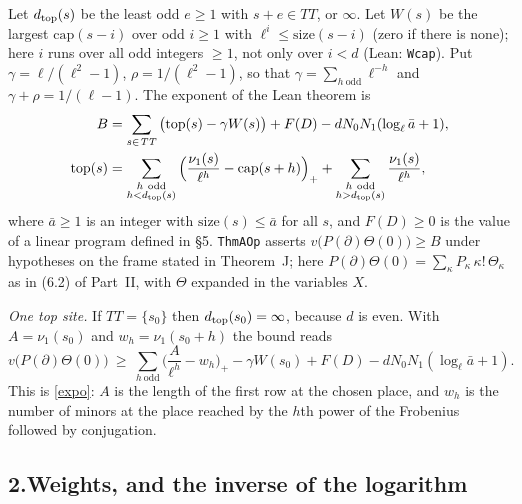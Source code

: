 \documentclass[11pt,letterpaper]{article}
\begin{document}
Let $d_{\rm top}(s)$ be the least odd $e\ge1$ with $s+e\in\mathit{TT}$, or $\infty$. Let $W(s)$ be the
largest $\mathrm{cap}(s-i)$ over odd $i\ge1$ with $\ell^i\le\mathrm{size}(s-i)$ (zero if there is none);
here $i$ runs over all odd integers $\ge1$, not only over $i<d$ (Lean: \texttt{Wcap}). Put
$\gamma=\ell/(\ell^2-1)$, $\rho=1/(\ell^2-1)$, so that $\gamma=\sum_{h\ \mathrm{odd}}\ell^{-h}$ and
$\gamma+\rho=1/(\ell-1)$. The exponent of the Lean theorem is
\begin{equation}\label{dv:B}
\begin{aligned}
 B&=\sum_{s\in\mathit{TT}}\big(\mathrm{top}(s)-\gamma W(s)\big)+F(D)-dN_0N_1(\log_\ell\bar a+1),\\
 \mathrm{top}(s)&=\sum_{\substack{h\ \mathrm{odd}\\ h<d_{\rm top}(s)}}\Big(\frac{\nu_1(s)}{\ell^h}-\mathrm{cap}(s+h)\Big)_+
   +\sum_{\substack{h\ \mathrm{odd}\\ h>d_{\rm top}(s)}}\frac{\nu_1(s)}{\ell^h},
\end{aligned}
\end{equation}
where $\bar a\ge1$ is an integer with $\mathrm{size}(s)\le\bar a$ for all $s$, and $F(D)\ge0$ is the value of a linear
program defined in \S5. \texttt{ThmAOp} asserts $v\big(P(\partial)\Theta(0)\big)\ge B$ under hypotheses on the
frame stated in Theorem~J; here $P(\partial)\Theta(0)=\sum_\kappa P_\kappa\,\kappa!\,\Theta_\kappa$ as in
(6.2) of Part~II, with $\Theta$ expanded in the variables $X$.

\emph{One top site.} If $\mathit{TT}=\{s_0\}$ then $d_{\rm top}(s_0)=\infty$, because $d$ is even. With
$A=\nu_1(s_0)$ and $w_h=\nu_1(s_0+h)$ the bound reads
\begin{equation}\label{dv:onerow}
 v\big(P(\partial)\Theta(0)\big)\ \ge\ \sum_{h\ \mathrm{odd}}\Big(\frac A{\ell^h}-w_h\Big)_+
   -\gamma W(s_0)+F(D)-dN_0N_1(\log_\ell\bar a+1).
\end{equation}
This is \eqref{expo}: $A$ is the length of the first row at the chosen place, and $w_h$ is the number of
minors at the place reached by the $h$th power of the Frobenius followed by conjugation.

\subsection*{2.\quad Weights, and the inverse of the logarithm}
\end{document}
